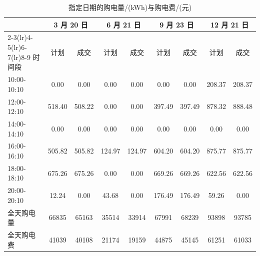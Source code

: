\documentclass[zihao=-4,a4paper,fontset=none]{ctexart}
\begin{document}
\begin{table}[htbp]
\centering
\caption{指定日期的购电量/(kWh)与购电费/(元)}
{\small
\begin{tabular}{lcccccccc}
\toprule
& \multicolumn{2}{c}{3 月 20 日} & \multicolumn{2}{c}{6 月 21 日}
& \multicolumn{2}{c}{9 月 23 日} & \multicolumn{2}{c}{12 月 21 日} \\
\cmidrule(lr){2-3}\cmidrule(lr){4-5}\cmidrule(lr){6-7}\cmidrule(lr){8-9}
时间段 & 计划 & 成交 & 计划 & 成交 & 计划 & 成交 & 计划 & 成交 \\
\midrule
10:00-10:10 & 0.00 & 0.00 & 0.00 & 0.00 & 0.00 & 0.00 & 208.37 & 208.37 \\
12:00-12:10 & 518.40 & 508.22 & 0.00 & 0.00 & 397.49 & 397.49 & 878.32 & 888.48 \\
14:00-14:10 & 0.00 & 0.00 & 0.00 & 0.00 & 0.00 & 0.00 & 0.00 & 0.00 \\
16:00-16:10 & 505.82 & 505.82 & 124.97 & 124.97 & 604.20 & 604.20 & 875.77 & 875.77 \\
18:00-18:10 & 675.26 & 675.26 & 0.00 & 0.00 & 669.26 & 669.26 & 622.56 & 622.56 \\
20:00-20:10 & 12.24 & 0.00 & 43.68 & 0.00 & 176.49 & 176.49 & 59.26 & 0.00 \\
\midrule
全天购电量 & 66835 & 65163 & 35514 & 33914 & 67991 & 68239 & 93898 & 93785 \\
全天购电费 & 41039 & 40108 & 21174 & 19159 & 44875 & 45145 & 61251 & 61033 \\
\bottomrule
\end{tabular}}
\label{tab:p3day1}
\end{table}
\end{document}
